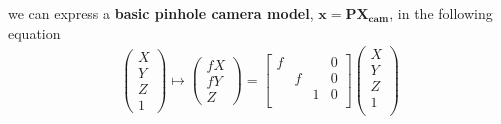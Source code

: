 we can express a \textbf{basic pinhole camera model}, $\mathbf{x = PX_{cam}}$, in the following equation
\begin{gather}
\label{eq:ch1-basic-pinhole}
\begin{pmatrix} X  \\ Y \\ Z \\ 1 \end{pmatrix} \mapsto
\begin{pmatrix} fX  \\ fY \\ Z  \end{pmatrix}
=
\begin{bmatrix}
f &   &   & 0\\
& f &   & 0\\
&   & 1 & 0\\ 
\end{bmatrix}
\begin{pmatrix}
X\\
Y\\
Z\\
1\\
\end{pmatrix}
\end{gather}

